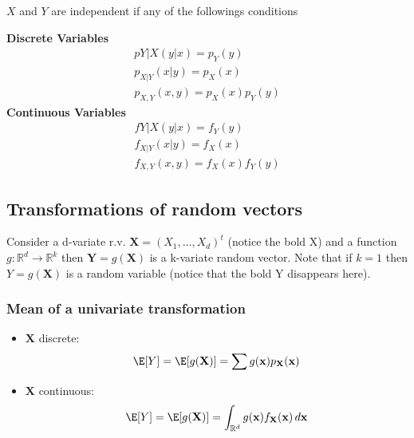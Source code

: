 $X$ and $Y$ are independent if any of the followings conditions

\begin{multicols}{2}
\setlength{\columnseprule}{0.5pt}
    \textbf{Discrete Variables} 
    \begin{multline*} 
        p{Y|X}(y|x)=p_Y(y)\\
        p_{X|Y}(x|y)=p_X(x)\\
        p_{X,Y}(x,y)=p_X(x)p_Y(y)
    \end{multline*}
    \textbf{Continuous Variables} 
    \begin{multline*}
        f{Y|X}(y|x)=f_Y(y)\\
        f_{X|Y}(x|y)=f_X(x)\\
        f_{X,Y}(x,y)=f_X(x)f_Y(y)
    \end{multline*}
\end{multicols}


\subsection{Transformations of random vectors} %
\label{sub:transformations_of_random_vectors}

Consider a d-variate r.v. $\textbf{X}=(X_1,\dots,X_d)^t$ (notice the bold X) and a
function $g:\mathbb{R}^d \rightarrow \mathbb{R}^k$ then
$\textbf{Y}=g(\textbf{X})$ is a k-variate random vector. Note that if $k=1$ then
$Y=g(\textbf{X})$ is a random variable (notice that the bold Y disappears here).

\subsubsection{Mean of a univariate transformation} %
\label{ssub:mean_of_a_univariate_transformation}

\begin{itemize}
    \item $\textbf{X}$ discrete:
    \begin{equation*}
         \E[Y]=\E[g(\textbf{X})]=\sum g(\textbf{x})p_\textbf{X}(\textbf{x})
     \end{equation*}
    \item $\textbf{X}$ continuous:
    \begin{equation*}
        \E[Y]=\E[g(\textbf{X})]=\int_{\mathbb{R}^d} g(\textbf{x})f_\textbf{X}
        (\textbf{x})\,d\textbf{x}
    \end{equation*}
\end{itemize}

